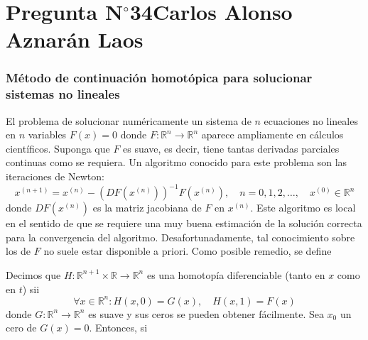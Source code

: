\section{Pregunta N$^{\circ}$34\qquad Carlos Alonso Aznarán Laos}

\begin{frame}
	\frametitle{
		Método de continuación homotópica para solucionar sistemas no
		lineales
	}

	El problema de solucionar numéricamente un sistema de $n$
	ecuaciones no lineales en $n$ variables $F\left(x\right)=0$
	donde
	\begin{math}
		F\colon\mathbb{R}^{n}\to\mathbb{R}^{n}
	\end{math}
	aparece ampliamente en cálculos científicos.
	Suponga que $F$ es suave, es decir, tiene tantas derivadas
	parciales continuas como se requiera.
	Un algoritmo conocido para este problema son las
	\alert{iteraciones de Newton}:
	\begin{equation*}
		x^{\left(n+1\right)}=
		x^{\left(n\right)}-
		{\left(DF\left(x^{\left(n\right)}\right)\right)}^{-1}
		F\left(x^{\left(n\right)}\right),\quad
		n=0,1,2,\dotsc,\quad
		x^{\left(0\right)}\in\mathbb{R}^{n}
	\end{equation*}
	donde
	\begin{math}
		DF\left(x^{\left(n\right)}\right)
	\end{math}
	es la \alert{matriz jacobiana} de $F$ en $x^{\left(n\right)}$.
	Este algoritmo es \alert{local} en el sentido de que se requiere
	una muy buena estimación de la solución correcta para la
	convergencia del algoritmo.
	Desafortunadamente, tal conocimiento sobre los de $F$ no suele
	estar disponible a priori.
	Como posible remedio, se define

	\begin{definition}
		Decimos que
		\begin{math}
			H\colon
			\mathbb{R}^{n+1}\times\mathbb{R}\to
			\mathbb{R}^{n}
		\end{math}
		es una \alert{homotopía diferenciable} (tanto en $x$ como en $t$)
		sii
		\begin{equation*}
			\forall x\in\mathbb{R}^{n}:
			H\left(x,0\right)=
			G\left(x\right),\quad
			H\left(x,1\right)=
			F\left(x\right)
		\end{equation*}
		donde
		\begin{math}
			G\colon\mathbb{R}^{n}\to\mathbb{R}^{n}
		\end{math}
		es suave y sus ceros se pueden obtener fácilmente.
		Sea $x_{0}$ un cero de $G\left(x\right)=0$.
		Entonces, si
	\end{definition}


\end{frame}
